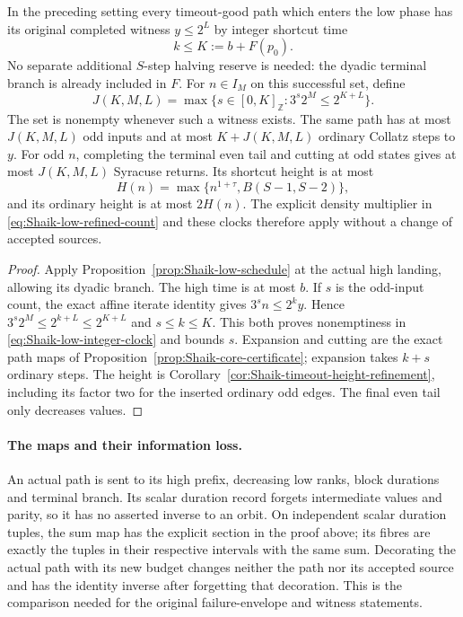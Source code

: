 \begin{corollary}
\label{cor:Shaik-low-schedule-clocks}
In the preceding setting every timeout-good path which enters
the low phase has its original completed witness \(y\le2^L\) by
integer shortcut time
\[
 k\le K:=b+F(p_0).
\]
No separate additional \(S\)-step halving reserve is needed:
the dyadic terminal branch is already included in \(F\).
For \(n\in I_M\) on this successful set, define
\begin{equation}\label{eq:Shaik-low-integer-clock}
 J(K,M,L)=\max\{s\in[0,K]_{\mathbb Z}:3^s2^M\le2^{K+L}\}.
\end{equation}
The set is nonempty whenever such a witness exists.
The same path has at most \(J(K,M,L)\) odd inputs and at most
\(K+J(K,M,L)\) ordinary Collatz steps to \(y\).
For odd \(n\), completing the terminal even tail and cutting at odd
states gives at most \(J(K,M,L)\) Syracuse returns.
Its shortcut height is at most
\[
 H(n)=\max\{n^{1+\tau}, B(S-1,S-2)\},
\]
and its ordinary height is at most \(2H(n)\).
The explicit density multiplier in \eqref{eq:Shaik-low-refined-count}
and these clocks therefore apply without a change of accepted sources.
\end{corollary}
\begin{proof}
Apply Proposition~\ref{prop:Shaik-low-schedule} at the actual high
landing, allowing its dyadic branch. The high time is at most \(b\).
If \(s\) is the odd-input count, the exact affine iterate identity gives
\(3^sn\le2^ky\). Hence
\(3^s2^M\le2^{k+L}\le2^{K+L}\) and \(s\le k\le K\).
This both proves nonemptiness in \eqref{eq:Shaik-low-integer-clock}
and bounds \(s\). Expansion and cutting are the exact path maps
of Proposition~\ref{prop:Shaik-core-certificate}; expansion takes
\(k+s\) ordinary steps. The height is
Corollary~\ref{cor:Shaik-timeout-height-refinement}, including its
factor two for the inserted ordinary odd edges. The final even
tail only decreases values.
\end{proof}

\paragraph{The maps and their information loss.}
An actual path is sent to its high prefix, decreasing low ranks,
block durations and terminal branch. Its scalar duration record
forgets intermediate values and parity, so it has no asserted
inverse to an orbit. On independent scalar duration tuples, the
sum map has the explicit section in the proof above; its fibres
are exactly the tuples in their respective intervals with the
same sum. Decorating the actual path with its new budget changes
neither the path nor its accepted source and has the identity
inverse after forgetting that decoration. This is the comparison
needed for the original failure-envelope and witness statements.

